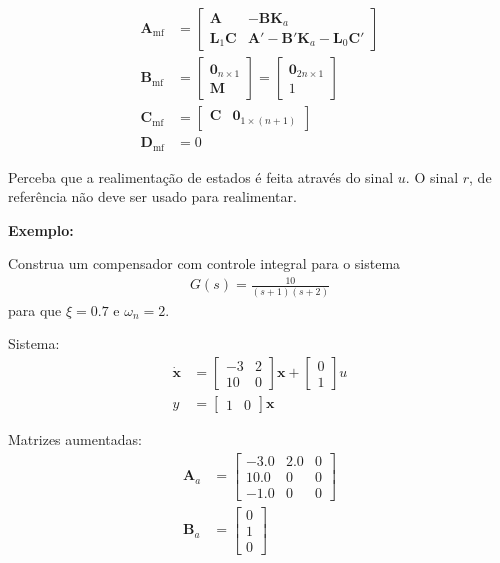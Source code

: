\documentclass[
]{book}
\begin{document}
\begin{align}
\mathbf{A}_{\text{mf}} &= \left[\begin{array}{cc}
    \mathbf{A} & -\mathbf{B}\mathbf{K}_a\\
    \mathbf{L}_1\mathbf{C} & \mathbf{A}'-\mathbf{B}'\mathbf{K}_a-\mathbf{L}_0\mathbf{C}'
\end{array}\right]\\
\mathbf{B}_{\text{mf}} &= \left[\begin{array}{cc}
    \mathbf{0}_{n\times 1} \\ \mathbf{M}
\end{array}\right] = \left[\begin{array}{cc}
    \mathbf{0}_{2n\times 1} \\ 1
\end{array}\right]\\
\mathbf{C}_{\text{mf}} &= \left[\begin{array}{cc}
    \mathbf{C} & \mathbf{0}_{1\times (n+1)}
\end{array}\right]\\
\mathbf{D}_{\text{mf}} &= 0
\end{align}

Perceba que a realimentação de estados é feita através do sinal \(u\). O
sinal \(r\), de referência não deve ser usado para realimentar.

\textbf{Exemplo:}

Construa um compensador com controle integral para o sistema \[
\begin{align}
    G(s) = \frac{10}{(s+1)(s+2)}
\end{align}
\] para que \(\xi = 0.7\) e \(\omega_n=2\).

Sistema: \begin{align}
  \dot{\mathbf{x}} &= \left[\begin{matrix}-3 & 2\\10 & 0\end{matrix}\right]\mathbf{x} + \left[\begin{matrix}0\\1\end{matrix}\right]u\\
  y &= \left[\begin{matrix}1 & 0\end{matrix}\right]\mathbf{x}
\end{align}

Matrizes aumentadas:
\begin{align}
\mathbf{A}_a &= \left[\begin{matrix}-3.0 & 2.0 & 0\\10.0 & 0 & 0\\-1.0 & 0 & 0\end{matrix}\right]\\
\mathbf{B}_a &= \left[\begin{matrix}0\\1\\0\end{matrix}\right]
\end{align}\\
\end{document}
